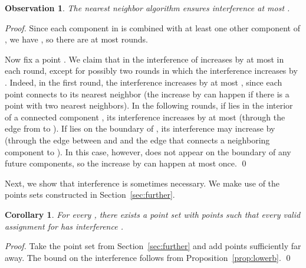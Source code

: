\documentclass[envcountsect,envcountsame,runningheads,a4paper]{llncs}
\newtheorem{obs}[theorem]{Observation}
\newtheorem{corol}[theorem]{Corollary}
\begin{document}
\begin{obs}\label{obs:nna_upper}
The nearest neighbor algorithm ensures interference at most
.
\end{obs}

\begin{proof}
Since each component in  is combined with at least one
other component of , we have ,
so there are at most  rounds.

Now fix a point . We claim that in the interference
of  increases by at most  in each round, except for
possibly two rounds in which the interference increases by .
Indeed, in the first round, the interference increases by at most ,
since each point connects to its nearest neighbor (the increase by  can
happen if there is a point with two nearest neighbors).
In the following rounds, if  lies in the interior of a connected component ,
its interference increases by at most  (through the edge from
 to ). If  lies on the boundary of
, its interference may increase by  (through the edge between
 and  and the edge that connects a neighboring component
to ). In this case, however,  does not appear on the boundary of
any future components, so the increase by  can happen at most once.
\qed{}
\end{proof}


Next, we show that interference
 is sometimes necessary.
We make use of the points sets  constructed in Section~\ref{sec:further}.


\begin{corol}
For every , there exists a point set  with  points such that
every valid assignment for  has interference .
\end{corol}

\begin{proof}
Take the point set  from Section~\ref{sec:further} and add
 points sufficiently far away.
The bound on the interference follows from Proposition~\ref{prop:lowerb}.
\qed{}
\end{proof}
\end{document}
